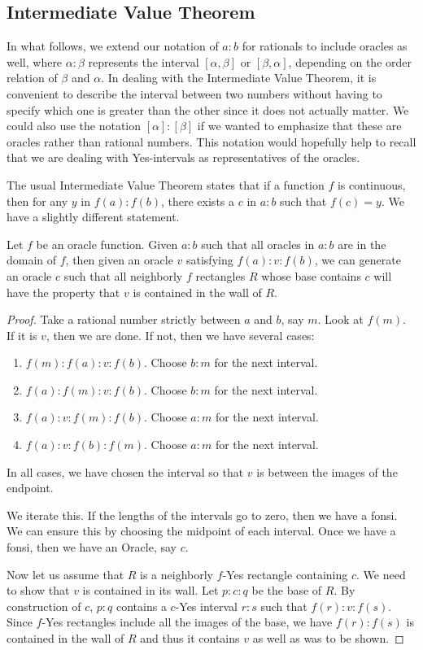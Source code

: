 \documentclass[12pt]{article}
\begin{document}
\subsection{Intermediate Value Theorem}

In what follows, we extend our notation of $a:b$ for rationals to include oracles as well, where $\alpha : \beta$ represents the interval $[\alpha,\beta]$ or $[\beta, \alpha]$, depending on the order relation of $\beta$ and $\alpha$. In dealing with the Intermediate Value Theorem, it is convenient to describe the interval between two numbers without having to specify which one is greater than the other since it does not actually matter. We could also use the notation $[\alpha]:[\beta]$ if we wanted to emphasize that these are oracles rather than rational numbers. This notation would hopefully help to recall that we are dealing with Yes-intervals as representatives of the oracles.

The usual Intermediate Value Theorem states that if a function $f$ is continuous, then for any $y$ in $f(a):f(b)$, there exists a $c$ in $a:b$ such that $f(c) = y$. We have a slightly different statement.

\begin{theorem}
Let $f$ be an oracle function. Given $a:b$ such that all oracles in $a:b$ are in the domain of $f$, then given an oracle $v$ satisfying $f(a):v:f(b)$, we can generate an oracle $c$ such that all neighborly $f$ rectangles $R$ whose base contains $c$ will have the property that $v$ is contained in the wall of $R$.
\end{theorem}

\begin{proof}
Take a rational number strictly between $a$ and $b$, say $m$. Look at $f(m)$. If it is $v$, then we are done. If not, then we have several cases: 
\begin{enumerate}
\item $f(m):f(a):v:f(b)$. Choose $b:m$ for the next interval.
\item $f(a):f(m):v:f(b)$. Choose $b:m$ for the next interval. 
\item $f(a):v:f(m):f(b)$. Choose $a:m$ for the next interval.
\item $f(a):v:f(b):f(m)$. Choose $a:m$ for the next interval. 
\end{enumerate}
In all cases, we have chosen the interval so that $v$ is between the images of the endpoint. 

We iterate this. If the lengths of the intervals go to zero, then we have a fonsi. We can ensure this by choosing the midpoint of each interval. Once we have a fonsi, then we have an Oracle, say $c$. 

Now let us assume that $R$ is a neighborly $f$-Yes rectangle containing $c$. We need to show that $v$ is contained in its wall. Let $p:c:q$ be the base of $R$. By construction of $c$, $p:q$ contains a $c$-Yes interval $r:s$ such that $f(r):v:f(s)$. Since $f$-Yes rectangles include all the images of the base, we have $f(r):f(s)$ is contained in the wall of $R$ and thus it contains $v$ as well as was to be shown. 
\end{proof}
\end{document}
